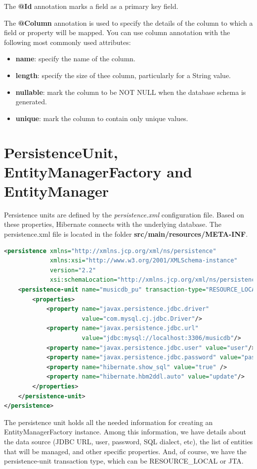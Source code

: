 The \textbf{@Id} annotation marks a field as a primary key field.

The \textbf{@Column} annotation is used to specify the details of the column to which a field or property will be mapped. You can use column annotation with the following most commonly used attributes:
\begin{itemize}
\item \textbf{name}: specify the name of the column.
\item \textbf{length}: specify the size of thee column, particularly for a String value.
\item \textbf{nullable}: mark the column to be NOT NULL when the database schema is generated.
\item \textbf{unique}: mark the column to contain only unique values.
\end{itemize}


\section{PersistenceUnit,  EntityManagerFactory and EntityManager}


Persistence units are defined by the \textit{persistence.xml} configuration file.  Based on these properties, Hibernate connects with the underlying database.  The persistence.xml file is located in the folder \textbf{src/main/resources/META-INF}.

\begin{lstlisting}[language=xml,frame=single]
<persistence xmlns="http://xmlns.jcp.org/xml/ns/persistence"
             xmlns:xsi="http://www.w3.org/2001/XMLSchema-instance"
             version="2.2"
             xsi:schemaLocation="http://xmlns.jcp.org/xml/ns/persistence http://xmlns.jcp.org/xml/ns/persistence/persistence_2_2.xsd">
	<persistence-unit name="musicdb_pu" transaction-type="RESOURCE_LOCAL">
		<properties>
			<property name="javax.persistence.jdbc.driver"
			          value="com.mysql.cj.jdbc.Driver"/>
			<property name="javax.persistence.jdbc.url"
			          value="jdbc:mysql://localhost:3306/musicdb"/>
			<property name="javax.persistence.jdbc.user" value="user"/>
			<property name="javax.persistence.jdbc.password" value="password"/>
			<property name="hibernate.show_sql" value="true" />
			<property name="hibernate.hbm2ddl.auto" value="update"/>
		</properties>
	</persistence-unit>
</persistence>
\end{lstlisting}

The persistence unit holds all the needed information for creating an EntityManagerFactory instance.  Among this information, we have details about the data source (JDBC URL, user, password, SQL dialect, etc), the list of entities that will be managed, and other specific properties. And, of course, we have the persistence-unit transaction type, which can be RESOURCE\_LOCAL or JTA. 

